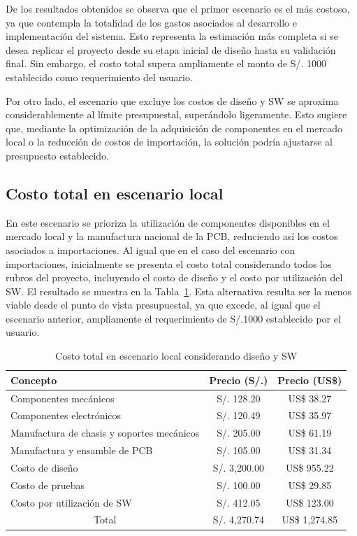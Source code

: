 \noindent
De los resultados obtenidos se observa que el primer escenario es el más costoso, ya que contempla la totalidad de los gastos asociados al desarrollo e implementación del sistema. Esto representa la estimación más completa si se desea replicar el proyecto desde su etapa inicial de diseño hasta su validación final. Sin embargo, el costo total supera ampliamente el monto de S/. 1000 establecido como requerimiento del usuario.

\noindent
Por otro lado, el escenario que excluye los costos de diseño y \ac{SW} se aproxima considerablemente al límite presupuestal, superándolo ligeramente. Esto sugiere que, mediante la optimización de la adquisición de componentes en el mercado local o la reducción de costos de importación, la solución podría ajustarse al presupuesto establecido.
\subsection{Costo total en escenario local}

\noindent
En este escenario se prioriza la utilización de componentes disponibles en el mercado local y la manufactura nacional de la \ac{PCB}, reduciendo así los costos asociados a importaciones. Al igual que en el caso del escenario con importaciones, inicialmente se presenta el costo total considerando todos los rubros del proyecto, incluyendo el costo de diseño y el costo por utilización del \ac{SW}. El resultado se muestra en la Tabla~\ref{tab:total_local_completo}. Esta alternativa resulta ser la menos viable desde el punto de vista presupuestal, ya que excede, al igual que el escenario anterior, ampliamente el requerimiento de S/.1000 establecido por el usuario.

\begin{table}[H]
\centering
\caption{Costo total en escenario local considerando diseño y \ac{SW}}
\label{tab:total_local_completo}

\vspace{0.5em}

\begin{tabular}{|p{7cm}||c|c|}
\hline
Concepto & Precio (S/.) & Precio (US\$) \\
\hline
Componentes mecánicos 
& S/. 128.20 
& US\$ 38.27 \\
\hline
Componentes electrónicos 
& S/. 120.49 
& US\$ 35.97 \\
\hline
Manufactura de chasis y soportes mecánicos 
& S/. 205.00 
& US\$ 61.19 \\
\hline
Manufactura y ensamble de \ac{PCB} 
& S/. 105.00 
& US\$ 31.34 \\
\hline
Costo de diseño 
& S/. 3,200.00 
& US\$ 955.22 \\
\hline
Costo de pruebas 
& S/. 100.00 
& US\$ 29.85 \\
\hline
Costo por utilización de \ac{SW} 
& S/. 412.05 
& US\$ 123.00 \\
\hline
\multicolumn{1}{|c||}{Total} 
& S/. 4,270.74 
& US\$ 1,274.85 \\
\hline
\end{tabular}
\end{table}

